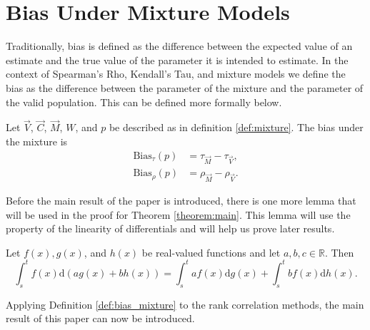 \section{Bias Under Mixture Models}\label{sec:bias_mixtures}
\hspace{24pt} Traditionally, bias is defined as the difference between the expected value of an estimate and the true value of the parameter it is intended to estimate. In the context of Spearman's Rho, Kendall's Tau, and mixture models we define the bias as the difference between the parameter of the mixture and the parameter of the valid population. This can be defined more formally below.
\begin{definition}\label{def:bias_mixture}
    Let $\vec{V}$, $\vec{C}$, $\vec{M}$, $W$, and $p$ be described as in definition \ref{def:mixture}.  The bias under the mixture is
    \begin{align*}
        \text{Bias}_{\tau}(p)&=\tau_{\vec{M}}-\tau_{\vec{V}},\\
        \text{Bias}_{\rho}(p)&=\rho_{\vec{M}}-\rho_{\vec{V}}.
    \end{align*}
\end{definition}
Before the main result of the paper is introduced, there is one more lemma that will be used in the proof for Theorem \ref{theorem:main}. This lemma will use the property of the linearity of differentials and will help us prove later results.
\begin{lemma}\label{lem:differential}
    Let $f(x), g(x)$, and $h(x)$ be real-valued functions and let $a,b,c\in\mathbb{R}$. Then $$\int_s^t f(x)\mathrm{d}\left(ag(x)+bh(x)\right)=\int_s^t af(x)\mathrm{d}g(x)+\int_s^t bf(x)\mathrm{d}h(x).$$
\end{lemma}
Applying Definition \ref{def:bias_mixture} to the rank correlation methods, the main result of this paper can now be introduced.

